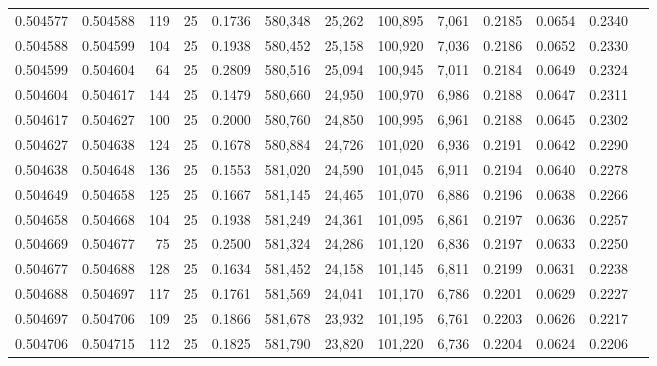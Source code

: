 \begin{tabular}{rrrrrrrrrrrrr}
0.504577 & 0.504588 & 119 &  25 &                                     0.1736 & 580,348 &  25,262 & 100,895 &   7,061 & 0.2185 & 0.0654 & 0.2340 \\
0.504588 & 0.504599 & 104 &  25 &                                     0.1938 & 580,452 &  25,158 & 100,920 &   7,036 & 0.2186 & 0.0652 & 0.2330 \\
0.504599 & 0.504604 &  64 &  25 &                                     0.2809 & 580,516 &  25,094 & 100,945 &   7,011 & 0.2184 & 0.0649 & 0.2324 \\
0.504604 & 0.504617 & 144 &  25 &                                     0.1479 & 580,660 &  24,950 & 100,970 &   6,986 & 0.2188 & 0.0647 & 0.2311 \\
0.504617 & 0.504627 & 100 &  25 &                                     0.2000 & 580,760 &  24,850 & 100,995 &   6,961 & 0.2188 & 0.0645 & 0.2302 \\
0.504627 & 0.504638 & 124 &  25 &                                     0.1678 & 580,884 &  24,726 & 101,020 &   6,936 & 0.2191 & 0.0642 & 0.2290 \\
0.504638 & 0.504648 & 136 &  25 &                                     0.1553 & 581,020 &  24,590 & 101,045 &   6,911 & 0.2194 & 0.0640 & 0.2278 \\
0.504649 & 0.504658 & 125 &  25 &                                     0.1667 & 581,145 &  24,465 & 101,070 &   6,886 & 0.2196 & 0.0638 & 0.2266 \\
0.504658 & 0.504668 & 104 &  25 &                                     0.1938 & 581,249 &  24,361 & 101,095 &   6,861 & 0.2197 & 0.0636 & 0.2257 \\
0.504669 & 0.504677 &  75 &  25 &                                     0.2500 & 581,324 &  24,286 & 101,120 &   6,836 & 0.2197 & 0.0633 & 0.2250 \\
0.504677 & 0.504688 & 128 &  25 &                                     0.1634 & 581,452 &  24,158 & 101,145 &   6,811 & 0.2199 & 0.0631 & 0.2238 \\
0.504688 & 0.504697 & 117 &  25 &                                     0.1761 & 581,569 &  24,041 & 101,170 &   6,786 & 0.2201 & 0.0629 & 0.2227 \\
0.504697 & 0.504706 & 109 &  25 &                                     0.1866 & 581,678 &  23,932 & 101,195 &   6,761 & 0.2203 & 0.0626 & 0.2217 \\
0.504706 & 0.504715 & 112 &  25 &                                     0.1825 & 581,790 &  23,820 & 101,220 &   6,736 & 0.2204 & 0.0624 & 0.2206 \\

\end{tabular}

